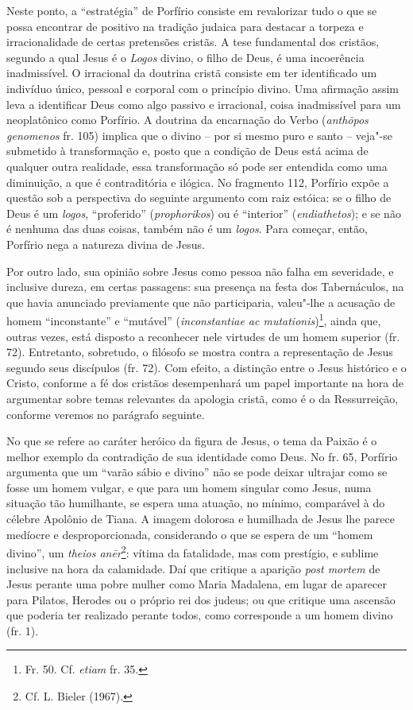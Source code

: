 Neste ponto, a “estratégia” de Porfírio consiste em revalorizar tudo o
que se possa encontrar de positivo na tradição judaica para destacar a
torpeza e irracionalidade de certas pretensões cristãs. A tese
fundamental dos cristãos, segundo a qual Jesus é o \textit{Logos}
divino, o filho de Deus, é uma incoerência inadmissível. O irracional
da doutrina cristã consiste em ter identificado um indivíduo único,
pessoal e corporal com o princípio divino. Uma afirmação assim leva a
identificar Deus como algo passivo e irracional, coisa inadmissível
para um neoplatônico como Porfírio. A doutrina da encarnação do Verbo
(\textit{anthōpos genomenos} fr. 105) implica que o divino – por si mesmo puro e
santo -- veja"-se
submetido à transformação e, posto que a condição de Deus está acima de
qualquer outra realidade, essa transformação só pode ser entendida como
uma diminuição, a que é contraditória e ilógica. No fragmento 112,
Porfírio expõe a questão sob a perspectiva do seguinte argumento com
raiz estóica: se o filho de Deus é um \textit{logos}, “proferido”
(\textit{prophorikos})
ou é “interior” (\textit{endiathetos}); 
e se não é nenhuma das duas coisas, também não é um \textit{logos}.
Para começar, então, Porfírio nega a natureza divina de Jesus.

Por outro lado, sua opinião sobre Jesus como pessoa não falha em
severidade, e inclusive dureza, em certas passagens: sua presença na
festa dos Tabernáculos, na que havia anunciado previamente que não
participaria, valeu"-lhe a acusação de homem “inconstante” e “mutável”
(\textit{inconstantiae ac mutationis})\footnote{ Fr. 50. Cf.
\textit{etiam} fr. 35.}, ainda que, outras vezes, está disposto a
reconhecer nele virtudes de um homem superior (fr. 72). Entretanto,
sobretudo, o filósofo se mostra contra a representação de Jesus segundo
seus discípulos (fr. 72). Com efeito, a distinção entre o Jesus
histórico e o Cristo, conforme a fé dos cristãos desempenhará um papel
importante na hora de argumentar sobre temas relevantes da apologia
cristã, como é o da Ressurreição, conforme veremos no parágrafo
seguinte.

No que se refere ao caráter heróico da figura de Jesus, o tema da Paixão
é o melhor exemplo da contradição de sua identidade como Deus. No fr.
65, Porfírio argumenta que um “varão sábio e divino”
 não se pode
deixar ultrajar como se fosse um homem vulgar,
e que para um homem singular como Jesus, numa situação tão humilhante,
se espera uma atuação, no mínimo, comparável à do célebre Apolônio de
Tiana. A imagem dolorosa e humilhada de Jesus lhe parece medíocre e
desproporcionada, considerando o que se espera de um “homem divino”,
um \textit{theios anēr}\footnote{
Cf. L. Bieler (1967).}: vítima da fatalidade, mas com prestígio, e
sublime inclusive na hora da calamidade. Daí que critique a aparição
\textit{post mortem }de Jesus perante uma pobre mulher como Maria
Madalena, em lugar de aparecer para Pilatos, Herodes ou o próprio rei
dos judeus; ou que critique uma ascensão que poderia ter realizado
perante todos, como corresponde a um homem divino (fr. 1).

